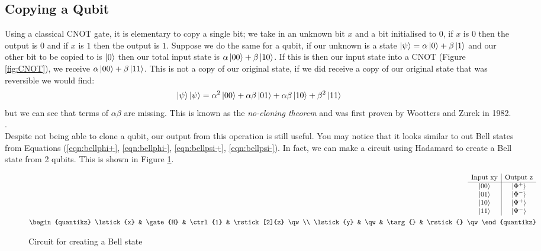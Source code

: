 \documentclass[reqno]{amsart}
\numberwithin{equation}{section}
\numberwithin{figure}{section}
\begin{document}
\subsection{Copying a Qubit}
\begin{justify}
    Using a classical CNOT gate, it is elementary to copy a single bit; we take in an unknown bit $x$ and a bit initialised to $0$, if $x$ is $0$ then the output is $0$ and if $x$ is $1$ then the output is $1$. Suppose we do the same for a qubit, if our unknown is a state $\ket{\psi} = \alpha\ket{0} + \beta\ket{1}$ and our other bit to be copied to is $\ket{0}$ then our total input state is $\alpha\ket{00} + \beta\ket{10}$. If this is then our input state into a CNOT (Figure \ref{fig:CNOT}), we receive $\alpha\ket{00} + \beta\ket{11}$. This is not a copy of our original state, if we did receive a copy of our original state that was reversible we would find:
    \begin{equation}
        \ket{\psi}\ket{\psi} = \alpha^{2}\ket{00} + \alpha\beta\ket{01} + \alpha\beta\ket{10} + \beta^{2}\ket{11}
    \end{equation}
but we can see that terms of $\alpha\beta$ are missing. This is known as the \textit{no-cloning theorem} and was first proven by Wootters and Zurek in 1982. \cite{WoottersZurek1982}. \\

Despite not being able to clone a qubit, our output from this operation is still useful. You may notice that it looks similar to out Bell states from Equations (\ref{eqn:bellphi+}, \ref{eqn:bellphi-}, \ref{eqn:bellpsi+}, \ref{eqn:bellpsi-}). In fact, we can make a circuit using Hadamard to create a Bell state from 2 qubits. This is shown in Figure \ref{fig:BellState}.
    \begin{figure}[h]
        \begin{eqnarray*}
            \begin{array}{c|c}
                \text{Input xy} & \text{Output z} \\ 
                \hline
                \ket{00} & \ket{\Phi^{+}} \\
                \ket{01} & \ket{\Phi^{-}} \\
                \ket{10} & \ket{\Psi^{+}} \\
                \ket{11} & \ket{\Psi^{-}}
            \end{array} \\
            \begin{quantikz}
                \lstick{x} & \gate{H} & \ctrl{1} & \rstick[2]{z} \qw \\
                \lstick{y} & \qw & \targ{} & \rstick{} \qw
            \end{quantikz}
        \end{eqnarray*}
        \caption{Circuit for creating a Bell state}
        \label{fig:BellState}
    \end{figure}
\end{justify}
\end{document}
